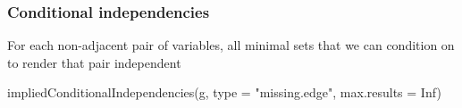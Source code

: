\documentclass[
]{article}
\newenvironment{Shaded}{\begin{snugshade}}{\end{snugshade}}
\newcommand{\AttributeTok}[1]{\textcolor[rgb]{0.77,0.63,0.00}{#1}}
\newcommand{\ConstantTok}[1]{\textcolor[rgb]{0.00,0.00,0.00}{#1}}
\newcommand{\FunctionTok}[1]{\textcolor[rgb]{0.00,0.00,0.00}{#1}}
\newcommand{\NormalTok}[1]{#1}
\newcommand{\StringTok}[1]{\textcolor[rgb]{0.31,0.60,0.02}{#1}}
\begin{document}
\hypertarget{conditional-independencies}{%
\subsubsection{Conditional
independencies}\label{conditional-independencies}}

For each non-adjacent pair of variables, all minimal sets that we can
condition on to render that pair independent

\begin{Shaded}
\begin{Highlighting}[]
\FunctionTok{impliedConditionalIndependencies}\NormalTok{(g, }\AttributeTok{type =} \StringTok{"missing.edge"}\NormalTok{, }\AttributeTok{max.results =} \ConstantTok{Inf}\NormalTok{)}
\end{Highlighting}
\end{Shaded}
\end{document}
